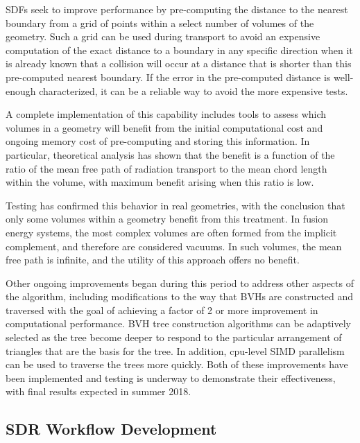 \glspl{SDF} seek to improve performance by pre-computing the distance to the
nearest boundary from a grid of points within a select number of volumes of
the geometry.  Such a grid can be used during transport to avoid an expensive
computation of the exact distance to a boundary in any specific direction when
it is already known that a collision will occur at a distance that is shorter
than this pre-computed nearest boundary.  If the error in the pre-computed
distance is well-enough characterized, it can be a reliable way to avoid the
more expensive tests.

A complete implementation of this capability includes tools to assess which
volumes in a geometry will benefit from the initial computational cost and
ongoing memory cost of pre-computing and storing this information.  In
particular, theoretical analysis has shown that the benefit is a function of
the ratio of the mean free path of radiation transport to the mean chord
length within the volume, with maximum benefit arising when this ratio is
low\cite{shriwise_NET}.

Testing has confirmed this behavior in real geometries, with the conclusion
that only some volumes within a geometry benefit from this treatment.  In
fusion energy systems, the most complex volumes are often formed from the
implicit complement, and therefore are considered vacuums.  In such volumes,
the mean free path is infinite, and the utility of this approach offers no
benefit.

Other ongoing improvements began during this period to address other aspects
of the algorithm, including modifications to the way that \glspl{BVH} are
constructed and traversed with the goal of achieving a factor of 2 or more
improvement in computational performance.  \gls{BVH} tree construction
algorithms can be adaptively selected as the tree become deeper to respond to
the particular arrangement of triangles that are the basis for the tree.  In
addition, cpu-level \gls{SIMD} parallelism can be used to traverse the trees
more quickly.  Both of these improvements have been implemented and testing is
underway to demonstrate their effectiveness, with final results expected in
summer 2018.

\subsection{\gls{SDR} Workflow Development}

